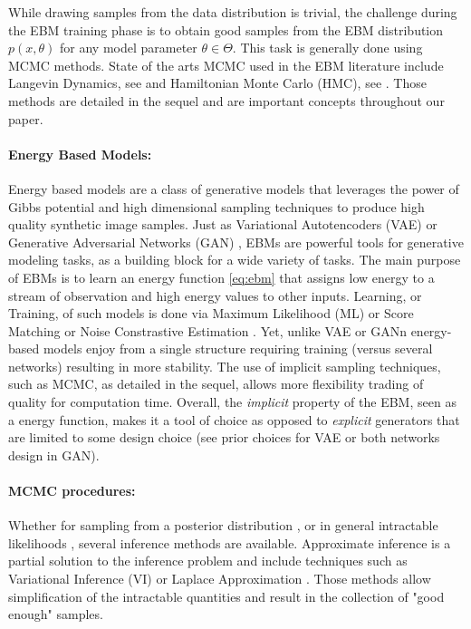 \documentclass[10pt,twocolumn,letterpaper]{article}
\begin{document}
While drawing samples from the data distribution is trivial, the challenge during the EBM training phase is to obtain good samples from the EBM distribution $p(x,\theta)$ for any model parameter $\theta \in \Theta$.
This task is generally done using MCMC methods.
State of the arts MCMC used in the EBM literature include Langevin Dynamics, see \cite{grenander1994representations,roberts1996exponential} and Hamiltonian Monte Carlo (HMC), see \cite{neal2011mcmc}.
Those methods are detailed in the sequel and are important concepts throughout our paper.

\paragraph{Energy Based Models: }
Energy based models \cite{lecun2006tutorial,ngiam2011learning} are a class of generative models that leverages the power of Gibbs potential and high dimensional sampling techniques to produce high quality synthetic image samples.
Just as Variational Autotencoders (VAE) \cite{kingma2013auto} or Generative Adversarial Networks (GAN) \cite{goodfellow2014generative}, EBMs are powerful tools for generative modeling tasks, as a building block for a wide variety of tasks. 
The main purpose of EBMs is to learn an energy function \eqref{eq:ebm} that assigns low energy to a stream of observation and high energy values to other inputs.
Learning, or Training, of such models is done via Maximum Likelihood (ML) \cite{du2019implicit} or Score Matching \cite{song2020score} or Noise Constrastive Estimation \cite{gao2020flow}.
Yet, unlike VAE or GANn energy-based models enjoy from a single structure requiring training (versus several networks) resulting in more stability.
The use of implicit sampling techniques, such as MCMC, as detailed in the sequel, allows more flexibility trading of quality for computation time.
Overall, the \emph{implicit} property of the EBM, seen as a energy function, makes it a tool of choice as opposed to \emph{explicit} generators that are limited to some design choice (see prior choices for VAE or both networks design in GAN).


\paragraph{MCMC procedures: }
Whether for sampling from a posterior distribution \cite{}, or in general intractable likelihoods \cite{}, several inference methods are available.
Approximate inference is a partial solution to the inference problem and include techniques such as Variational Inference (VI) \cite{jordanvi,freitas} or Laplace Approximation \cite{wolfinger,rue2009approximate}. 
Those methods allow simplification of the intractable quantities and result in the collection of "good enough" samples.
\end{document}
